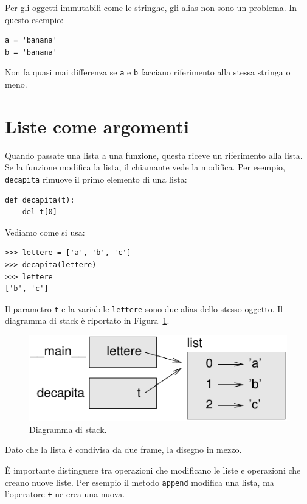 \documentclass[10pt]{book}
\begin{document}
Per gli oggetti immutabili come le stringhe, gli alias non sono un problema. In questo esempio:

\begin{verbatim}
a = 'banana'
b = 'banana'
\end{verbatim}
%
Non fa quasi mai differenza se {\tt a} e {\tt b} facciano riferimento alla stessa stringa o meno.


\section{Liste come argomenti}
\label{list.arguments}

Quando passate una lista a una funzione, questa riceve un riferimento alla lista. Se la funzione modifica la lista, il chiamante vede la modifica. Per esempio, \verb"decapita" rimuove il primo elemento di una lista:

\begin{verbatim}
def decapita(t):
    del t[0]
\end{verbatim}
%
Vediamo come si usa:

\begin{verbatim}
>>> lettere = ['a', 'b', 'c']
>>> decapita(lettere)
>>> lettere
['b', 'c']
\end{verbatim}
%
Il parametro {\tt t} e la variabile {\tt lettere} sono due alias dello stesso oggetto. Il diagramma di stack è riportato in Figura~\ref{fig.stack5}.

\begin{figure}
\centerline
{\includegraphics[scale=0.8]{figs/stack5.pdf}}
\caption{Diagramma di stack.}
\label{fig.stack5}
\end{figure}


Dato che la lista è condivisa da due frame, la disegno in mezzo.

È importante distinguere tra operazioni che modificano le liste e operazioni che creano nuove liste. Per esempio il metodo {\tt append} modifica una lista, ma l'operatore {\tt +} ne crea una nuova.
\end{document}
